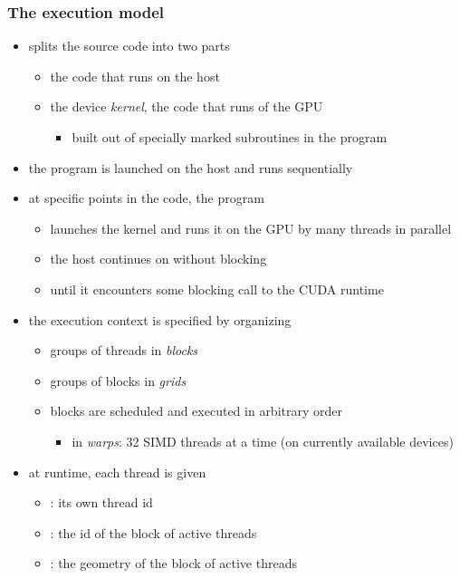\begin{frame}[fragile]
%
  \frametitle{The execution model}
%
  \begin{itemize}
%
  \item {} splits the source code into two parts
    \begin{itemize}
    \item the code that runs on the host
    \item the device {\em kernel}, the code that runs of the GPU 
      \begin{itemize}
      \item built out of specially marked subroutines in the program
      \end{itemize}
    \end{itemize}
  \item the program is launched on the host and runs sequentially
  \item at specific points in the code, the program
    \begin{itemize}
    \item launches the kernel and runs it on the GPU by many threads in parallel
    \item the host continues on without blocking 
    \item until it encounters some blocking call to the CUDA runtime
    \end{itemize}
%
  \item the execution context is specified by organizing
    \begin{itemize}
    \item groups of threads in {\em blocks}
    \item groups of blocks in {\em grids}
    \item blocks are scheduled and executed in arbitrary order
      \begin{itemize}
      \item in {\em warps}: 32 SIMD threads at a time (on currently available devices)
      \end{itemize}
    \end{itemize}
%
  \item at runtime, each thread is given
    \begin{itemize}
    \item {}: its own thread id
    \item {}: the id of the block of active threads
    \item {}: the geometry of the block of active threads
    \end{itemize}
%
  \end{itemize}
%
\end{frame}


